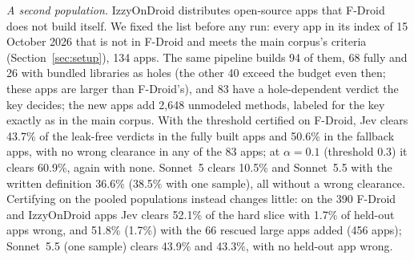 \emph{A second population.}
IzzyOnDroid distributes open-source apps that F-Droid does not build itself.
We fixed the list before any run: every app in its index of 15 October 2026 that is not in F-Droid and meets the main corpus's criteria (Section~\ref{sec:setup}), 134 apps.
The same pipeline builds 94 of them, 68 fully and 26 with bundled libraries as holes (the other 40 exceed the budget even then; these apps are larger than F-Droid's), and 83 have a hole-dependent verdict the key decides; the new apps add 2{,}648 unmodeled methods, labeled for the key exactly as in the main corpus.
With the threshold certified on F-Droid, Jev clears 43.7\% of the leak-free verdicts in the fully built apps and 50.6\% in the fallback apps, with no wrong clearance in any of the 83 apps; at $\alpha=0.1$ (threshold 0.3) it clears 60.9\%, again with none.
Sonnet~5 clears 10.5\% and Sonnet~5.5 with the written definition 36.6\% (38.5\% with one sample), all without a wrong clearance.
Certifying on the pooled populations instead changes little: on the 390 F-Droid and IzzyOnDroid apps Jev clears 52.1\% of the hard slice with 1.7\% of held-out apps wrong, and 51.8\% (1.7\%) with the 66 rescued large apps added (456 apps); Sonnet~5.5 (one sample) clears 43.9\% and 43.3\%, with no held-out app wrong.

